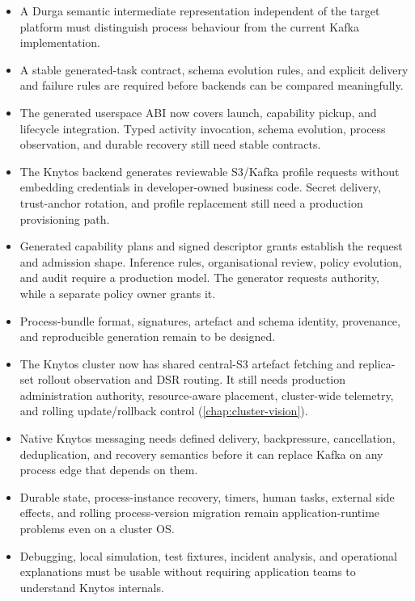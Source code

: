 \begin{itemize}
    \item A Durga semantic intermediate representation independent of the target
        platform must distinguish process behaviour from the current Kafka
        implementation.

    \item A stable generated-task contract, schema evolution rules, and explicit
        delivery and failure rules are required before backends can be
        compared meaningfully.

    \item The generated userspace ABI now covers launch, capability pickup, and
        lifecycle integration. Typed activity invocation, schema evolution,
        process observation, and durable recovery still need stable contracts.

    \item The Knytos backend generates reviewable S3/Kafka profile requests
        without embedding credentials in developer-owned business code. Secret
        delivery, trust-anchor rotation, and profile replacement still need a
        production provisioning path.

    \item Generated capability plans and signed descriptor grants establish the
        request and admission shape. Inference rules, organisational review,
        policy evolution, and audit require a production model. The generator
        requests authority, while a separate policy owner grants it.

    \item Process-bundle format, signatures, artefact and schema identity,
        provenance, and reproducible generation remain to be designed.

    \item The Knytos cluster now has shared central-S3 artefact fetching and
        replica-set rollout observation and DSR routing. It still needs
        production administration authority, resource-aware placement,
        cluster-wide telemetry, and rolling update/rollback control
        (\autoref{chap:cluster-vision}).

    \item Native Knytos messaging needs defined delivery, backpressure,
        cancellation, deduplication, and recovery semantics before it can
        replace Kafka on any process edge that depends on them.

    \item Durable state, process-instance recovery, timers, human tasks,
        external side effects, and rolling process-version migration remain
        application-runtime problems even on a cluster OS.

    \item Debugging, local simulation, test fixtures, incident analysis, and
        operational explanations must be usable without requiring application
        teams to understand Knytos internals.
\end{itemize}

